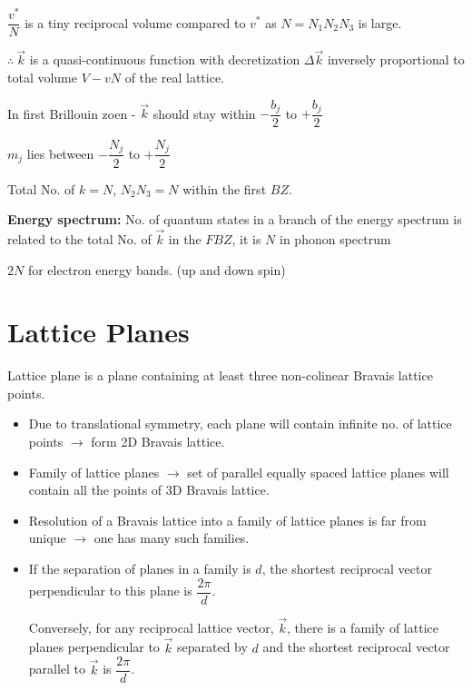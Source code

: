 $\dfrac{v^{*}}{N}$ is a tiny reciprocal volume compared to $v^{*}$ as $N=N_{1}N_{2}N_{3}$ is large.

$\therefore \ \overrightarrow{k}$ is a quasi-continuous function with decretization $\Delta \overrightarrow{k}$ inversely proportional to total volume $V-vN$ of the real lattice.

In first Brillouin zoen - $\overrightarrow{k}$ should stay within $-\dfrac{b_{j}}{2}$ to $+\dfrac{b_{j}}{2}$

$m_{j}$ lies between $-\dfrac{N_{j}}{2}$ to $+\dfrac{N_{j}}{2}$

Total No. of $k=N$, $N_{2}N_{3}=N$ within the first $BZ$.

\noindent
{\bf Energy spectrum:} No. of quantum states in a branch of the energy spectrum is related to the total No. of $\overrightarrow{k}$ in the $FBZ$, it is $N$ in phonon spectrum

$2N$ for electron energy bands. (up and down spin)

\section*{Lattice Planes}

Lattice plane is a plane containing at least three non-colinear Bravais lattice points.
\begin{itemize}
\itemsep=0pt
\item Due to translational symmetry, each plane will contain infinite no. of lattice points $\to$ form 2D Bravais lattice.

\item Family of lattice planes $\to$ set of parallel equally spaced lattice planes will contain all the points of 3D Bravais lattice.

\item Resolution of a Bravais lattice into a family of lattice planes is far from unique $\to$ one has many such families.

\item If the separation of planes in a family is $d$, the shortest reciprocal vector perpendicular to this plane is $\dfrac{2\pi}{d}$.

Conversely, for any reciprocal lattice vector, $\overrightarrow{k}$, there is a family of lattice planes perpendicular to $\overrightarrow{k}$ separated by $d$ and the shortest reciprocal vector parallel to $\overrightarrow{k}$ is $\dfrac{2\pi}{d}$.
\end{itemize}

